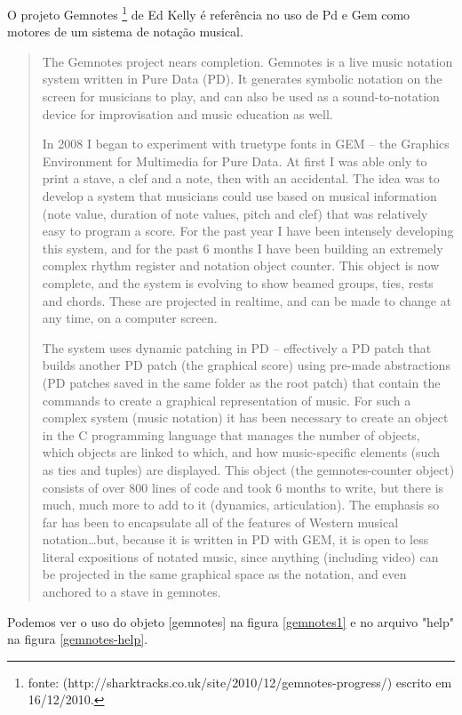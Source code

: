 \documentclass{ppgmus}
\begin{document}
O projeto Gemnotes \footnote{fonte: (http://sharktracks.co.uk/site/2010/12/gemnotes-progress/) escrito em 16/12/2010.}
de Ed Kelly é referência no uso
de Pd e Gem como motores de um sistema de notação
musical.

\begin{quotation}
 The Gemnotes project nears completion. Gemnotes is a live music notation system written in Pure Data (PD). 
It generates symbolic notation on the screen for musicians to play, and can also be used as a sound-to-notation 
device for improvisation and music education as well.

In 2008 I began to experiment with truetype fonts in GEM – the Graphics Environment for Multimedia for Pure Data. At first I was able only to print a stave, a clef and a note, then with an accidental. The idea was to develop a system that musicians could use based on musical information (note value, duration of note values, pitch and clef) that was relatively easy to program a score. For the past year I have been intensely developing this system, and for the past 6 months I have been building an extremely complex rhythm register and notation object counter. This object is now complete, and the system is evolving to show beamed groups, ties, rests and chords. These are projected in realtime, and can be made to change at any time, on a computer screen.

The system uses dynamic patching in PD – effectively a PD patch that builds another PD patch (the graphical score) 
using pre-made abstractions (PD patches saved in the same folder as the root patch) that contain the commands to 
create a graphical representation of music. For such a complex system (music notation) it has been necessary to 
create an object in the C programming language that manages the number of objects, which objects are linked to which, 
and how music-specific elements (such as ties and tuples) are displayed. This object (the gemnotes-counter object) 
consists of over 800 lines of code and took 6 months to write, but there is much, much more to add to it 
(dynamics, articulation). The emphasis so far has been to encapsulate all of the features of Western musical 
notation…but, because it is written in PD with GEM, it is open to less literal expositions of notated music, 
since anything (including video) can be projected in the same graphical space as the notation, and even anchored 
to a stave in gemnotes.
\end{quotation} 

Podemos ver o uso do objeto [gemnotes] na figura \ref{gemnotes1} e no arquivo "help" na figura \ref{gemnotes-help}.
\end{document}

